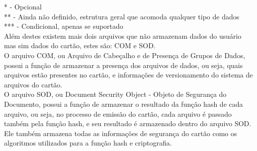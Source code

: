 \documentclass{article}
\begin{document}
\begin{flushleft}
			\hspace{2cm} * - Opcional\\
			\hspace{2cm} ** - Ainda não definido, estrutura geral que acomoda qualquer tipo de dados\\
			\hspace{2cm} *** - Condicional, apenas se suportado\\
			\vspace{10px}
			\hspace{2cm}Além destes existem mais dois arquivos que não armazenam dados do usuário mas sim dados do cartão, estes são: COM e SOD.\\
			\hspace{2cm} O arquivo COM, ou Arquivo de Cabeçalho e de Presença de Grupos de Dados, possui a função de armazenar a presença dos arquivos de dados, ou seja, quais arquivos estão presentes no cartão, e informações de versionamento do sistema de arquivos do cartão. \\
			\hspace{2cm}O arquivo SOD, ou Document Security Object - Objeto de Segurança do Documento, possui a função de armazenar o resultado da função hash de cada arquivo, ou seja, no processo de emissão do cartão, cada arquivo é passado também pela função hash, e seu resultado é armazenado dentro do arquivo SOD. Ele também armazena todas as informações de segurança do cartão como os algoritmos utilizados para a função hash e criptografia.
		\end{flushleft}
    
\end{document}
